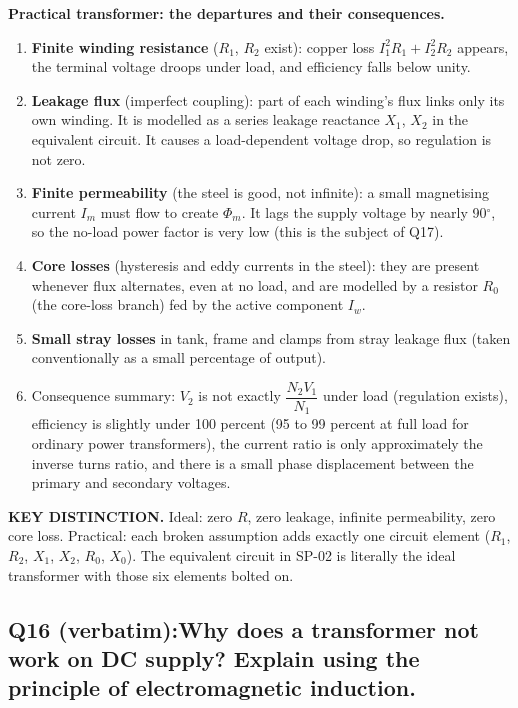 \documentclass[11pt]{article}
\newcommand{\qhead}[2]{\subsection*{\color{copper}#1\quad\color{iron}#2}}
\newcommand{\keydist}[1]{\vspace{2pt}\textbf{\color{red}KEY DISTINCTION.} #1}
\begin{document}
\textbf{Practical transformer: the departures and their consequences.}
\begin{enumerate}[label=\arabic*.]
\item \textbf{Finite winding resistance} ($R_1$, $R_2$ exist): copper loss $I_1^2 R_1 + I_2^2 R_2$ appears, the terminal voltage droops under load, and efficiency falls below unity.
\item \textbf{Leakage flux} (imperfect coupling): part of each winding's flux links only its own winding. It is modelled as a series leakage reactance $X_1$, $X_2$ in the equivalent circuit. It causes a load-dependent voltage drop, so regulation is not zero.
\item \textbf{Finite permeability} (the steel is good, not infinite): a small magnetising current $I_m$ must flow to create $\Phi_m$. It lags the supply voltage by nearly 90$^\circ$, so the no-load power factor is very low (this is the subject of Q17).
\item \textbf{Core losses} (hysteresis and eddy currents in the steel): they are present whenever flux alternates, even at no load, and are modelled by a resistor $R_0$ (the core-loss branch) fed by the active component $I_w$.
\item \textbf{Small stray losses} in tank, frame and clamps from stray leakage flux (taken conventionally as a small percentage of output).
\item Consequence summary: $V_2$ is not exactly $\dfrac{N_2 V_1}{N_1}$ under load (regulation exists), efficiency is slightly under 100 percent (95 to 99 percent at full load for ordinary power transformers), the current ratio is only approximately the inverse turns ratio, and there is a small phase displacement between the primary and secondary voltages.
\end{enumerate}

\keydist{Ideal: zero $R$, zero leakage, infinite permeability, zero core loss. Practical: each broken assumption adds exactly one circuit element ($R_1$, $R_2$, $X_1$, $X_2$, $R_0$, $X_0$). The equivalent circuit in SP-02 is literally the ideal transformer with those six elements bolted on.}

\qhead{Q16 (verbatim):}{Why does a transformer not work on DC supply? Explain using the principle of electromagnetic induction.}
\end{document}
